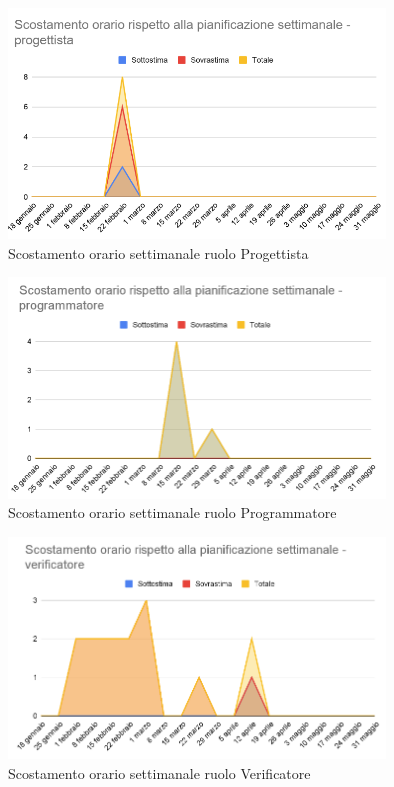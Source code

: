 \begin{figure}[H]
	\centering
	\includegraphics[width=10cm]{res/images/progettista}
	\caption{Scostamento orario settimanale ruolo Progettista}
	\label{fig:Scostamento orario settimanale ruolo Progettista}
\end{figure}
\begin{figure}[H]
	\centering
	\includegraphics[width=10cm]{res/images/programmatore}
	\caption{Scostamento orario settimanale ruolo Programmatore}
	\label{fig:Scostamento orario settimanale ruolo Programmatore}
\end{figure}
\begin{figure}[H]
	\centering
	\includegraphics[width=10cm]{res/images/verificatore}
	\caption{Scostamento orario settimanale ruolo Verificatore}
	\label{fig:Scostamento orario settimanale ruolo Verificatore}
\end{figure}
